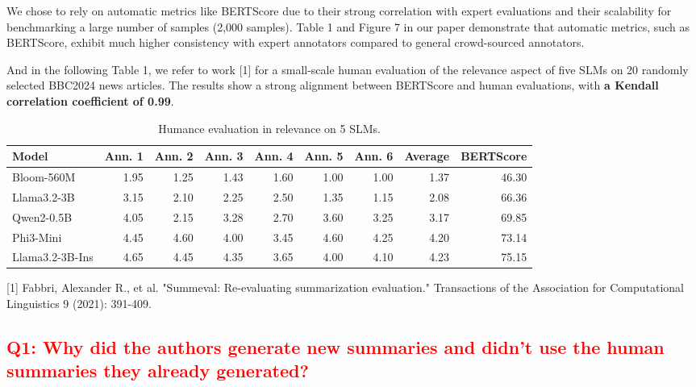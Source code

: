 \documentclass[a4paper]{article}
\begin{document}
{We chose to rely on automatic metrics like BERTScore due to their strong correlation with expert evaluations and their scalability for benchmarking a large number of samples (2,000 samples). Table 1 and Figure 7 in our paper demonstrate that automatic metrics, such as BERTScore, exhibit much higher consistency with expert annotators compared to general crowd-sourced annotators. }

{And in the following Table 1, we refer to work [1] for a small-scale human evaluation of the relevance aspect of five SLMs on 20 randomly selected BBC2024 news articles. The results show a strong alignment between BERTScore and human evaluations, with \textbf{a Kendall correlation coefficient of 0.99}.}


\begin{table}[h]
\centering
\caption{Humance evaluation in relevance on 5 SLMs.}
\label{tab:my-table}
\begin{tabular}{lrrrrrrrr}
\hline
Model           & Ann. 1 & Ann. 2 & Ann. 3 & Ann. 4 & Ann. 5 & Ann. 6 & Average & BERTScore \\ \hline
Bloom-560M      & 1.95   & 1.25   & 1.43   & 1.60   & 1.00   & 1.00   & 1.37    & 46.30     \\
Llama3.2-3B     & 3.15   & 2.10   & 2.25   & 2.50   & 1.35   & 1.15   & 2.08    & 66.36     \\
Qwen2-0.5B      & 4.05   & 2.15   & 3.28   & 2.70   & 3.60   & 3.25   & 3.17    & 69.85     \\
Phi3-Mini       & 4.45   & 4.60   & 4.00   & 3.45   & 4.60   & 4.25   & 4.20    & 73.14     \\
Llama3.2-3B-Ins & 4.65   & 4.45   & 4.35   & 3.65   & 4.00   & 4.10   & 4.23    & 75.15     \\ \hline
\end{tabular}
\end{table}

[1] Fabbri, Alexander R., et al. "Summeval: Re-evaluating summarization evaluation." Transactions of the Association for Computational Linguistics 9 (2021): 391-409.



\subsection{\textcolor{red}{Q1: Why did the authors generate new summaries and didn't use the human summaries they already generated?}}

\end{document}
